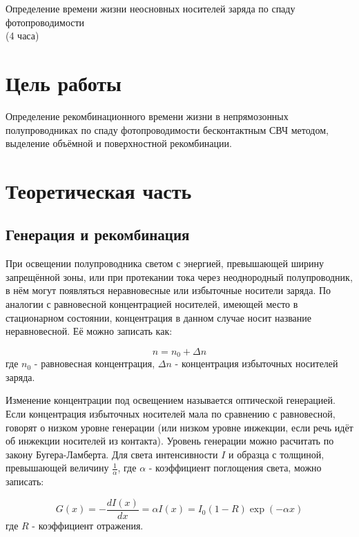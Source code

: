\newpage

\setcounter{chapter}{4}

\begin{center}
Определение времени жизни неосновных носителей заряда по спаду фотопроводимости\\
(4 часа)
\end{center}

\section{Цель работы}
Определение рекомбинационного времени жизни в непрямозонных полупроводниках по спаду фотопроводимости бесконтактным СВЧ методом, выделение объёмной и поверхностной рекомбинации.

\section{Теоретическая часть}

\subsection{Генерация и рекомбинация}
При освещении полупроводника светом с энергией, превышающей ширину запрещённой зоны, или при протекании тока через неоднородный полупроводник, в нём могут появляться неравновесные или избыточные носители заряда. По аналогии с равновесной концентрацией носителей, имеющей место в стационарном состоянии, концентрация в данном случае носит название неравновесной. Её можно записать как:

\begin{equation}
n = n_{0} + \Delta n
\end{equation}
где $n_{0}$ - равновесная концентрация, $\Delta n$ - концентрация избыточных носителей заряда.

Изменение концентрации под освещением называется оптической генерацией. Если концентрация избыточных носителей мала по сравнению с равновесной, говорят о низком уровне генерации (или низком уровне инжекции, если речь идёт об инжекции носителей из контакта). Уровень генерации можно расчитать по закону Бугера-Ламберта. Для света интенсивности $I$ и образца с толщиной, превышающей величину $\frac{1}{\alpha}$, где $\alpha$ - коэффициент поглощения света, можно записать:

\begin{equation}
G(x) = -\frac{d I(x)}{d x} = \alpha I(x) = I_{0} (1-R) \exp(-\alpha x)
\end{equation}
где $R$ - коэффициент отражения.

